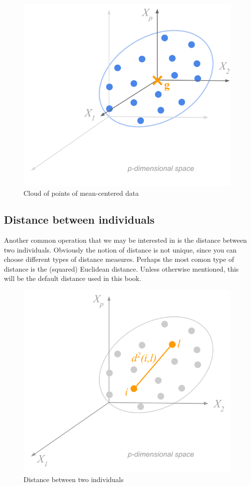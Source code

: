 \documentclass[]{book}
\begin{document}
\begin{figure}

{\centering \includegraphics[width=0.55\linewidth]{images/duality/cloud-obs-centering2} 

}

\caption{Cloud of points of mean-centered data}\label{fig:unnamed-chunk-14}
\end{figure}

\hypertarget{distance-between-individuals}{%
\subsection{Distance between individuals}\label{distance-between-individuals}}

Another common operation that we may be interested in is the distance between two individuals. Obviously the notion of distance is not unique, since you can choose different types of distance measures. Perhaps the most comon type of distance is the (squared) Euclidean distance. Unless otherwise mentioned, this will be the default distance used in this book.

\begin{figure}

{\centering \includegraphics[width=0.55\linewidth]{images/duality/cloud-obs-distance} 

}

\caption{Distance between two individuals}\label{fig:unnamed-chunk-15}
\end{figure}
\end{document}
